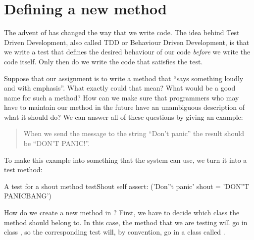 \documentclass[a4paper,10pt,twoside]{book}
\begin{document}
\section{Defining a new method}

The advent of \cite{Beck03a} has changed the way that we write code.  
The idea behind Test Driven Development, also called TDD or Behaviour Driven Development, is that we write a test that defines the desired behaviour of our code \emph{before} we write the code itself.
Only then do we write the code that satisfies the test.

Suppose that our assignment is to write a method that ``says something loudly and with emphasis''.  What exactly could that mean?  What would be a good name for such a method?  How can we make sure  that programmers who may have to maintain our method in the future have an unambiguous description of what it should do?   We can answer all of these questions by giving an example:

\begin{quote}
When we send the message  to the string ``Don't panic'' the result should be ``DON'T PANIC!''.
\end{quote}

\noindent
To make this example into something that the system can use, we turn it into a test method:

\begin{method}[testShout]{A test for a shout method}
testShout
	self assert: ('Don''t panic' shout = 'DON''T PANICBANG')
\end{method} %

How do we create a new method in \sq?   First, we have to decide which class the method should belong to.
In this case, the  method that we are testing will go in class , so the corresponding test will, by convention, go in a class called .
\end{document}
